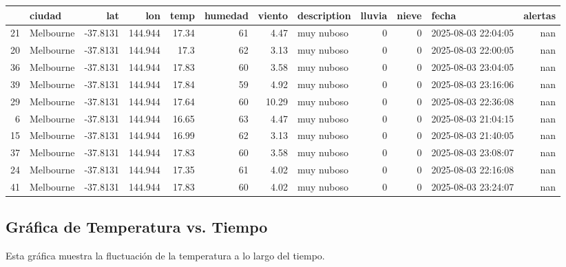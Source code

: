 \documentclass[11pt]{article}
\begin{document}
\begin{center}
\begin{tabular}{rlrrrrrlrrlr}
 & ciudad & lat & lon & temp & humedad & viento & description & lluvia & nieve & fecha & alertas\\[0pt]
\hline
21 & Melbourne & -37.8131 & 144.944 & 17.34 & 61 & 4.47 & muy nuboso & 0 & 0 & 2025-08-03 22:04:05 & nan\\[0pt]
20 & Melbourne & -37.8131 & 144.944 & 17.3 & 62 & 3.13 & muy nuboso & 0 & 0 & 2025-08-03 22:00:05 & nan\\[0pt]
36 & Melbourne & -37.8131 & 144.944 & 17.83 & 60 & 3.58 & muy nuboso & 0 & 0 & 2025-08-03 23:04:05 & nan\\[0pt]
39 & Melbourne & -37.8131 & 144.944 & 17.84 & 59 & 4.92 & muy nuboso & 0 & 0 & 2025-08-03 23:16:06 & nan\\[0pt]
29 & Melbourne & -37.8131 & 144.944 & 17.64 & 60 & 10.29 & muy nuboso & 0 & 0 & 2025-08-03 22:36:08 & nan\\[0pt]
6 & Melbourne & -37.8131 & 144.944 & 16.65 & 63 & 4.47 & muy nuboso & 0 & 0 & 2025-08-03 21:04:15 & nan\\[0pt]
15 & Melbourne & -37.8131 & 144.944 & 16.99 & 62 & 3.13 & muy nuboso & 0 & 0 & 2025-08-03 21:40:05 & nan\\[0pt]
37 & Melbourne & -37.8131 & 144.944 & 17.83 & 60 & 3.58 & muy nuboso & 0 & 0 & 2025-08-03 23:08:07 & nan\\[0pt]
24 & Melbourne & -37.8131 & 144.944 & 17.35 & 61 & 4.02 & muy nuboso & 0 & 0 & 2025-08-03 22:16:08 & nan\\[0pt]
41 & Melbourne & -37.8131 & 144.944 & 17.83 & 60 & 4.02 & muy nuboso & 0 & 0 & 2025-08-03 23:24:07 & nan\\[0pt]
\end{tabular}
\end{center}

\subsection{Gráfica de Temperatura vs. Tiempo}
\label{sec:orgcd68173}

Esta gráfica muestra la fluctuación de la temperatura a lo largo del tiempo.
\end{document}

